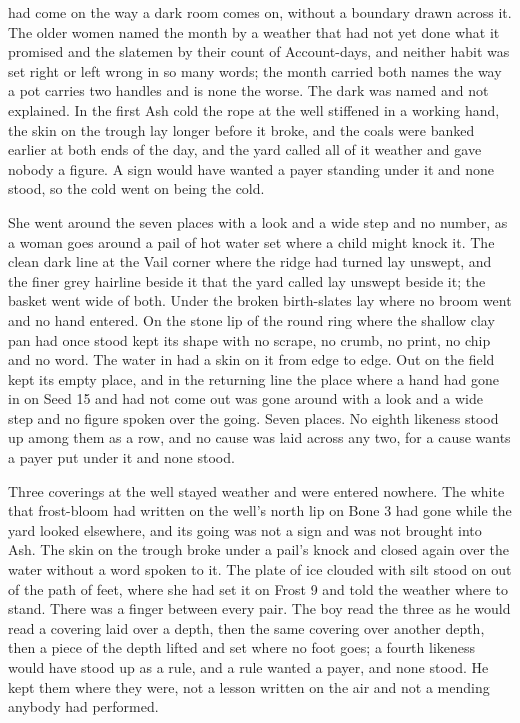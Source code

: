 had come on the way a dark room comes on, without a boundary drawn across it. The older women named the month by a weather that had not yet done what it promised and the slatemen by their count of Account-days, and neither habit was set right or left wrong in so many words; the month carried both names the way a pot carries two handles and is none the worse. The dark was named and not explained. In the first Ash cold the rope at the well stiffened in a working hand, the skin on the trough lay longer before it broke, and the coals were banked earlier at both ends of the day, and the yard called all of it weather and gave nobody a figure. A sign would have wanted a payer standing under it and none stood, so the cold went on being the cold.

She went around the seven places with a look and a wide step and no number, as a woman goes around a pail of hot water set where a child might knock it. The clean dark line at the Vail corner where the  ridge had turned lay unswept, and the finer grey hairline beside it that the yard called  lay unswept beside it; the basket went wide of both. Under  the broken birth-slates lay where no broom went and no hand entered. On the stone lip of  the round ring where the shallow clay pan had once stood kept its shape with no scrape, no crumb, no print, no chip and no word. The water in  had a skin on it from edge to edge. Out on  the field kept its empty place, and in the returning line the place where a hand had gone in on Seed 15 and had not come out was gone around with a look and a wide step and no figure spoken over the going. Seven places. No eighth likeness stood up among them as a row, and no cause was laid across any two, for a cause wants a payer put under it and none stood.

Three coverings at the well stayed weather and were entered nowhere. The white that frost-bloom had written on the well's north lip on Bone 3 had gone while the yard looked elsewhere, and its going was not a sign and was not brought into Ash. The skin on the trough broke under a pail's knock and closed again over the water without a word spoken to it. The plate of ice clouded with silt stood on  out of the path of feet, where she had set it on Frost 9 and told the weather where to stand. There was a finger between every pair. The boy read the three as he would read a covering laid over a depth, then the same covering over another depth, then a piece of the depth lifted and set where no foot goes; a fourth likeness would have stood up as a rule, and a rule wanted a payer, and none stood. He kept them where they were, not a lesson written on the air and not a mending anybody had performed.

